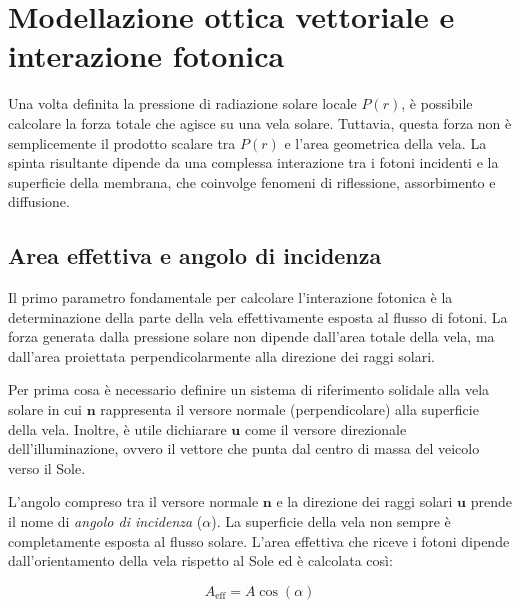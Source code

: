 
\section{Modellazione ottica vettoriale e interazione fotonica}
Una volta definita la pressione di radiazione solare locale $P(r)$, è possibile calcolare la forza totale che agisce su una vela solare. Tuttavia, questa forza non è semplicemente il prodotto scalare tra $P(r)$ e l'area geometrica della vela. La spinta risultante dipende da una complessa interazione tra i fotoni incidenti e la superficie della membrana, che coinvolge fenomeni di riflessione, assorbimento e diffusione.


\subsection{Area effettiva e angolo di incidenza}
Il primo parametro fondamentale per calcolare l'interazione fotonica è la determinazione della parte della vela effettivamente esposta al flusso di fotoni. La forza generata dalla pressione solare non dipende dall'area totale della vela, ma dall'area proiettata perpendicolarmente alla direzione dei raggi solari.

Per prima cosa è necessario definire un sistema di riferimento solidale alla vela solare in cui $\mathbf{n}$ rappresenta il versore normale (perpendicolare) alla superficie della vela. Inoltre, è utile dichiarare $\mathbf{u}$ come il versore direzionale dell'illuminazione, ovvero il vettore che punta dal centro di massa del veicolo verso il Sole. 

L'angolo compreso tra il versore normale $\mathbf{n}$ e la direzione dei raggi solari $\mathbf{u}$ prende il nome di \textit{angolo di incidenza} ($\alpha$). 
La superficie della vela non sempre è completamente esposta al flusso solare. L'area effettiva che riceve i fotoni dipende dall'orientamento della vela rispetto al Sole ed è calcolata così:

\begin{equation}
    A_{\text{eff}} = A \cos(\alpha)
\end{equation}

